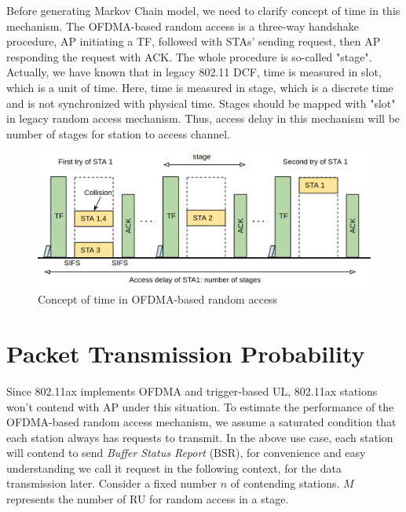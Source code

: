 Before generating Markov Chain model, we need to clarify concept of time in this mechanism.
The OFDMA-based random access is a three-way handshake procedure, AP initiating a TF, followed with STAs' sending request, then AP responding the request with ACK.
The whole procedure is so-called "stage".
Actually, we have known that in legacy 802.11 DCF, time is measured in slot, which is a unit of time.
Here, time is measured in stage, which is a discrete time and is not synchronized with physical time. 
Stages should be mapped with "slot" in legacy random access mechanism.
Thus, access delay in this mechanism will be number of stages for station to access channel.

\begin{figure}[!t]
\centering
\includegraphics[scale=0.27]{./figure/chp3/ra_time.png}
\caption{Concept of time in OFDMA-based random access}
\label{fig_ra_time}
\end{figure}



\section{Packet Transmission Probability} \label{sec_model}
Since 802.11ax implements OFDMA and trigger-based UL, 802.11ax stations won't contend with AP under this situation.
To estimate the performance of the OFDMA-based random access mechanism, we assume a saturated condition that each station always has requests to transmit.
In the above use case, each station will contend to send \textit{Buffer Status Report} (BSR), for convenience and easy understanding we call it request in the following context, for the data transmission later. 
Consider a fixed number $n$ of contending stations. 
$M$ represents the number of RU for random access in a stage. 


